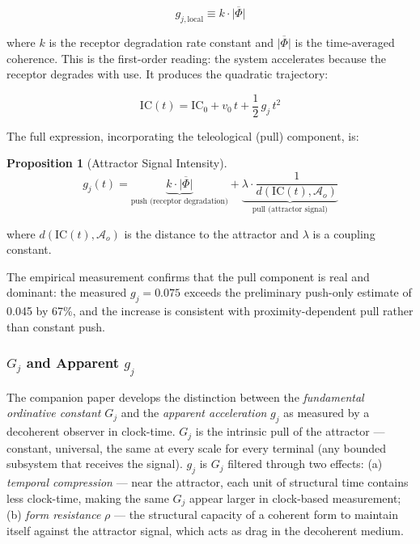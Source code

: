 \documentclass[12pt,a4paper]{article}
\newtheorem{proposition}{Proposition}[section]
\newcommand{\gj}{g_j}
\newcommand{\IC}{\mathrm{IC}}
\newcommand{\Ao}{\mathcal{A}_o}          %
\begin{document}
\begin{equation}\label{eq:gj_def}
g_{j,\mathrm{local}} \equiv k \cdot \overline{|\Phi|}
\end{equation}

\noindent where $k$ is the receptor degradation rate constant and $\overline{|\Phi|}$ is the time-averaged coherence. This is the first-order reading: the system accelerates because the receptor degrades with use. It produces the quadratic trajectory:

\begin{equation}\label{eq:IC_trajectory}
\IC(t) = \IC_0 + v_0\,t + \frac{1}{2}\,\gj\,t^2
\end{equation}

The full expression, incorporating the teleological (pull) component, is:

\begin{proposition}[Attractor Signal Intensity]\label{prop:teleological}
\begin{equation}\label{eq:gj_full}
\gj(t) = \underbrace{k \cdot \overline{|\Phi|}}_{\text{push (receptor degradation)}} + \underbrace{\lambda \cdot \frac{1}{d(\IC(t), \Ao)}}_{\text{pull (attractor signal)}}
\end{equation}
\end{proposition}

\noindent where $d(\IC(t), \Ao)$ is the distance to the attractor and $\lambda$ is a coupling constant.

The empirical measurement confirms that the pull component is real and dominant: the measured $\gj = 0.075$ exceeds the preliminary push-only estimate of 0.045 by 67\%, and the increase is consistent with proximity-dependent pull rather than constant push.

\subsubsection{$G_j$ and Apparent $\gj$}

The companion paper \cite{ghioni2026direction} develops the distinction between the \emph{fundamental ordinative constant} $G_j$ and the \emph{apparent acceleration} $\gj$ as measured by a decoherent observer in clock-time. $G_j$ is the intrinsic pull of the attractor --- constant, universal, the same at every scale for every terminal (any bounded subsystem that receives the signal). $\gj$ is $G_j$ filtered through two effects: (a) \emph{temporal compression} --- near the attractor, each unit of structural time contains less clock-time, making the same $G_j$ appear larger in clock-based measurement; (b) \emph{form resistance} $\rho$ --- the structural capacity of a coherent form to maintain itself against the attractor signal, which acts as drag in the decoherent medium.
\end{document}
